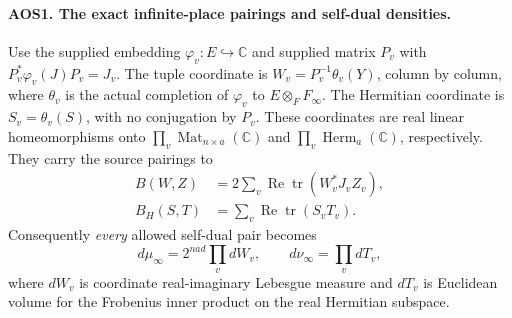 \paragraph{AOS1. The exact infinite-place pairings and self-dual densities.}
\label{claim:AOS1}
Use the supplied embedding $\varphi_v:E\hookrightarrow\mathbb C$
and supplied matrix $P_v$ with
$P_v^*\varphi_v(J)P_v=J_v$.  The tuple coordinate is
$W_v=P_v^{-1}\theta_v(Y)$, column by column, where $\theta_v$ is
the actual completion of $\varphi_v$ to $E\otimes_F F_\infty$.
The Hermitian coordinate is $S_v=\theta_v(S)$, with no conjugation by
$P_v$.  These coordinates are real linear homeomorphisms onto
$\prod_v\operatorname{Mat}_{n\times a}(\mathbb C)$ and
$\prod_v\operatorname{Herm}_a(\mathbb C)$, respectively.  They carry
the source pairings to
\[
 \begin{split}
 B(W,Z)&=2\sum_v\operatorname{Re}\operatorname{tr}(W_v^*J_vZ_v),\\
 B_H(S,T)&=\sum_v\operatorname{Re}\operatorname{tr}(S_vT_v).
 \end{split}
 \tag{AOS.6}
\]
Consequently \emph{every} allowed self-dual pair becomes
\[
             d\mu_\infty=2^{nad}\prod_v dW_v,
       \qquad d\nu_\infty=\prod_v dT_v,
 \tag{AOS.7}
\]
where $dW_v$ is coordinate real-imaginary Lebesgue measure and $dT_v$
is Euclidean volume for the Frobenius inner product on the real
Hermitian subspace.

